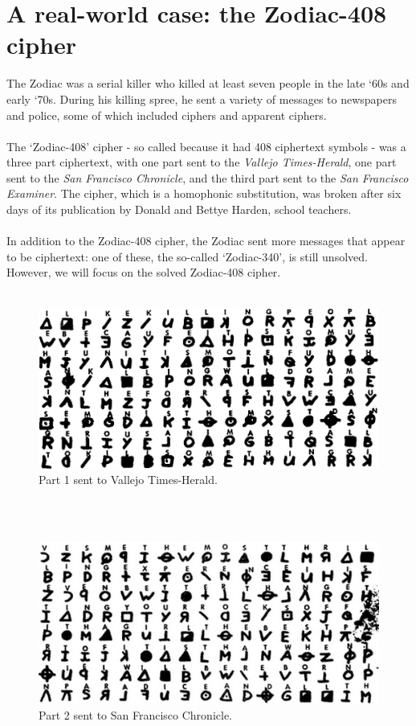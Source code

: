 \documentclass[Lau,binding=0.6cm,oneside]{sapthesis}
\begin{document}
\chapter{A real-world case: the Zodiac-408 cipher}
The Zodiac was a serial killer who killed at least seven people in the late `60s and early `70s. During his killing spree, he sent a variety of messages to newspapers and police, some of which included ciphers and apparent ciphers.\\\\
The `Zodiac-408' cipher - so called because it had 408 ciphertext symbols - was a three part ciphertext, with one part sent to the \textit{Vallejo Times-Herald}, one part sent to the \textit{San Francisco Chronicle}, and the third part sent to the \textit{San Francisco Examiner}. The cipher, which is a homophonic substitution, was broken after six days of its publication by Donald and Bettye Harden, school teachers.\\\\
In addition to the Zodiac-408 cipher, the Zodiac sent more messages that appear to be ciphertext: one of these, the so-called `Zodiac-340', is still unsolved. However, we will focus on the solved Zodiac-408 cipher.\\\\

\begin{figure}[H]
\includegraphics[scale=0.7]{zodiac_408_1}
\centering
\caption{Part 1 sent to Vallejo Times-Herald.}
\centering
\end{figure}
\ \\\\
\begin{figure}[H]
\includegraphics[scale=0.7]{zodiac_408_2}
\centering
\caption{Part 2 sent to San Francisco Chronicle.}
\centering
\end{figure}
\end{document}
